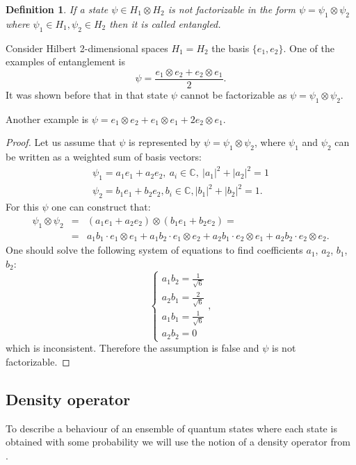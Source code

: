 \documentclass[11pt]{article}
\newtheorem{definition}{Definition}[section]
\begin{document}
\begin{definition}
If a state $\psi\in H_1\otimes H_2$ is not factorizable in the form $\psi = \psi_1\otimes\psi_2$ where $\psi_1\in H_1, \psi_2\in H_2$ then it is called entangled.
\end{definition}  
Consider Hilbert 2-dimensional spaces $H_1 = H_2$ the basis $\{e_1, e_2\}$. One of the examples of entanglement is 
\[
\psi = \frac{e_1\otimes e_2 + e_2\otimes e_1}{2}.
\]
It was shown before that in that state $\psi$ cannot be factorizable as $\psi = \psi_1\otimes\psi_2$.

Another example is $\psi = e_1\otimes e_2 + e_1 \otimes e_1 + 2e_2 \otimes e_1$.

\begin{proof}
Let us assume that $\psi$ is represented by $\psi = \psi_1\otimes\psi_2$, where $\psi_1$ and $\psi_2$ can be written as a weighted sum of basis vectors:
\begin{gather*}
	\psi_1 = a_1 e_1 + a_2 e_2,\ a_i\in \mathbb{C},\ |a_1|^2 + |a_2|^2 = 1 \\
	\psi_2 = b_1 e_1 + b_2 e_2, b_i\in \mathbb{C}, |b_1|^2 + |b_2|^2 = 1.
\end{gather*}
For this $\psi$ one can construct that:
\begin{eqnarray*}
	\psi_1 \otimes \psi_2 &=& (a_1 e_1 + a_2 e_2) \otimes (b_1 e_1 + b_2 e_2) = \\ &=&  
	a_1 b_1 \cdot e_1 \otimes e_1 + a_1 b_2 \cdot e_1 \otimes e_2 + 
	a_2 b_1 \cdot e_2 \otimes e_1 + a_2 b_2 \cdot e_2 \otimes e_2.
\end{eqnarray*}
One should solve the following system of equations to find coefficients $a_1$, $a_2$, $b_1$, $b_2$:
$$
\begin{cases}
a_1 b_2 = \frac{1}{\sqrt{6}} \\
a_2 b_1 = \frac{2}{\sqrt{6}} \\
a_1 b_1 = \frac{1}{\sqrt{6}} \\
a_2 b_2 = 0
\end{cases},
$$
which is inconsistent. Therefore the assumption is false and $\psi$ is not factorizable.
\end{proof}


\subsection{Density operator}

To describe a behaviour of an ensemble of quantum states where each state is obtained with some probability we will use the notion of a density operator from \cite{Khrennikov_information}.
\end{document}

